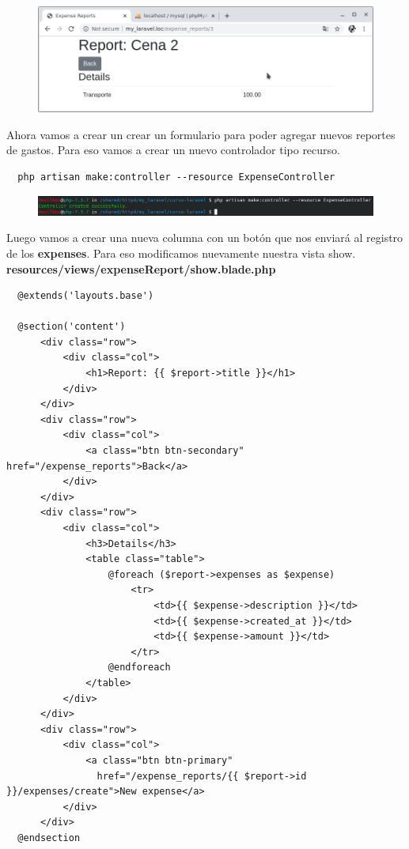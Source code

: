 \documentclass{article}
\begin{document}
\begin{figure}[h!]
  \centering
  \includegraphics[scale=0.5]{./Pictures/110_report_cena2.png}
\end{figure}

Ahora vamos a crear un crear un formulario para poder agregar nuevos reportes
de gastos. Para eso vamos a crear un nuevo controlador tipo recurso.\\

\begin{verbatim}
  php artisan make:controller --resource ExpenseController
\end{verbatim}

\newpage

\begin{figure}[h!]
  \centering
  \includegraphics[scale=0.7]{./Pictures/111_make_controller_expense.png}
\end{figure}

Luego vamos a crear una nueva columna con un botón que nos enviará al registro
de los \textbf{expenses}. Para eso modificamos nuevamente nuestra vista show.\\


\textbf{resources/views/expenseReport/show.blade.php}
\begin{verbatim}
  @extends('layouts.base')

  @section('content')
      <div class="row">
          <div class="col">
              <h1>Report: {{ $report->title }}</h1>
          </div>
      </div>
      <div class="row">
          <div class="col">
              <a class="btn btn-secondary" href="/expense_reports">Back</a>
          </div>
      </div>
      <div class="row">
          <div class="col">
              <h3>Details</h3>
              <table class="table">
                  @foreach ($report->expenses as $expense)
                      <tr>
                          <td>{{ $expense->description }}</td>
                          <td>{{ $expense->created_at }}</td>
                          <td>{{ $expense->amount }}</td>
                      </tr>
                  @endforeach
              </table>
          </div>
      </div>
      <div class="row">
          <div class="col">
              <a class="btn btn-primary"
                href="/expense_reports/{{ $report->id }}/expenses/create">New expense</a>
          </div>
      </div>
  @endsection
\end{verbatim}
\end{document}
